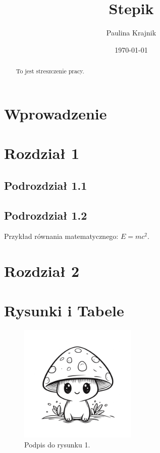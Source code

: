 \documentclass{article}
\title{Stepik}
\author{Paulina Krajnik}
\date{\today}
\begin{document}
\maketitle

\begin{abstract}
    To jest streszczenie pracy.
\end{abstract}

\section{Wprowadzenie}
    \lipsum[1]

\section{Rozdział 1}
    \subsection{Podrozdział 1.1}
        \lipsum[2]
    
    \subsection{Podrozdział 1.2}
        Przykład równania matematycznego: $E=mc^2$.

\section{Rozdział 2}
    \lipsum[3]

\section{Rysunki i Tabele}
    \begin{figure}[h]
        \centering
        \includegraphics[width=0.5\textwidth]{rysunek1.png}
        \caption{Podpis do rysunku 1.}
        \label{fig:rys1}
    \end{figure}
\end{document}
